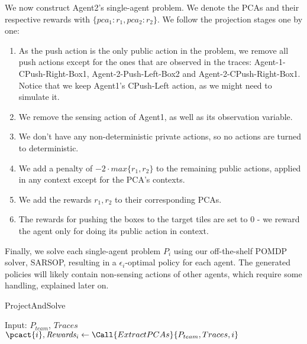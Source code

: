 {\begin{example}
We now construct Agent2's single-agent problem. We denote the PCAs and their respective rewards with $\{pca_1:r_1, pca_2: r_2\}$. We follow the projection stages one by one:
\begin{enumerate}
    \item As the push action is the only public action in the problem, we remove all push actions except for the ones that are observed in the traces: Agent-1-CPush-Right-Box1, Agent-2-Push-Left-Box2 and Agent-2-CPush-Right-Box1. Notice that we keep Agent1's CPush-Left action, as we might need to simulate it.
    \item We remove the sensing action of Agent1, as well as its observation variable.
    \item We don't have any non-deterministic private actions, so no actions are turned to deterministic.
    \item We add a penalty of $-2\cdot max\{r_1, r_2\}$ to the remaining public actions, applied in any context except for the PCA's contexts.
    \item We add the rewards ${r_1,  r_2}$ to their corresponding PCAs.
    \item The rewards for pushing the boxes to the target tiles are set to 0 - we reward the agent only for doing its public action in context.
\end{enumerate}
\end{example}

Finally, we solve each single-agent problem $P_i$ using our off-the-shelf POMDP solver, SARSOP, resulting in a $\epsilon_i$-optimal policy for each agent. The generated policies will likely
contain non-sensing actions of other agents, which require
some handling, explained later on.

\begin{algorithm}
\caption{ProjectAndSolve}
\begin{algorithmic}[tbph]
\State Input: $P_{team}$, $Traces$
\State $\pcact{i},\mathit{Rewards_i} \gets \Call{ExtractPCAs}{P_{team}, Traces, i}$
\EndFor
{}
\end{algorithmic}
\end{algorithm}





}
